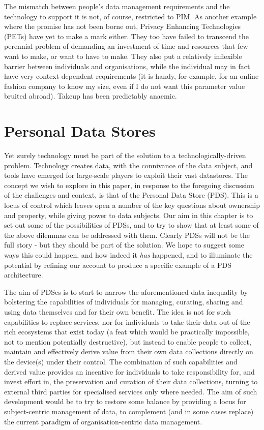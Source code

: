 \documentclass[runningheads,a4paper]{llncs}
\begin{document}
The mismatch between people’s data management requirements and the technology to support it is not, of course, restricted to PIM. As another example where the promise has not been borne out, Privacy Enhancing Technologies (PETs) \cite{wang2006privacy} have yet to make a mark either. They too have failed to transcend the perennial problem of demanding an investment of time and resources that few want to make, or want to have to make. They also put a relatively inflexible barrier between individuals and organisations, while the individual may in fact have very context-dependent requirements (it is handy, for example, for an online fashion company to know my size, even if I do not want this parameter value bruited abroad). Takeup has been predictably anaemic.

\section{Personal Data Stores}

Yet surely technology must be part of the solution to a technologically-driven problem. Technology creates data, with the connivance of the data subject, and tools have emerged for large-scale players to exploit their vast datastores. The concept we wish to explore in this paper, in response to the foregoing discussion of the challenges and context, is that of the Personal Data Store (PDS). This is a locus of control which leaves open a number of the key questions about ownership and property, while giving power to data subjects. Our aim in this chapter is to set out some of the possibilities of PDSs, and to try to show that at least some of the above dilemmas can be addressed with them. Clearly PDSs will not be the full story - but they should be part of the solution. We hope to suggest some ways this could happen, and how indeed it {\em has} happened, and to illuminate the potential by refining our account to produce a specific example of a PDS architecture.

The aim of PDSes is to start to narrow the aforementioned data inequality by bolstering the capabilities of individuals for managing, curating, sharing and using data themselves and for their own benefit.  The idea is not for such capabilities to replace services, nor for individuals to take their data out of the rich ecosystems that exist today (a feat which would be practically impossible, not to mention potentially destructive), but instead to enable people to collect, maintain and effectively derive value from their own data collections directly on the device(s) under their control.  The combination of such capabilities and derived value provides an incentive for individuals to take responsibility for, and invest effort in, the preservation and curation of their data collections, turning to external third parties for specialised services only where needed.  The aim of such development would be to try to restore some balance by providing a locus for subject-centric management of data, to complement (and in some cases replace) the current paradigm of organisation-centric data management.
\end{document}
